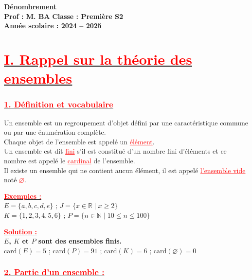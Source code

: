 \documentclass[a4paper,12pt]{article}
\begin{document}
\small

\begin{center}
    \Large\textbf{\underline{Dénombrement}}\\[-0.1cm]
    \normalsize\textbf{Prof : M. BA} \hfill \textbf{Classe : Première S2}\\[-0.1cm]
    \textbf{Année scolaire : 2024 -- 2025}
\end{center}

\section*{\underline{\textcolor{red}{I. Rappel sur la théorie des ensembles}}}

\subsubsection*{\underline{\textcolor{red}{1. Définition et vocabulaire}}}

Un ensemble est un regroupement d’objet défini par une caractéristique commune ou par une énumération complète.\\
Chaque objet de l’ensemble est appelé un \textcolor{red}{\underline{élément}}.\\
Un ensemble est dit \textcolor{red}{\underline{fini}} s’il est constitué d’un nombre fini d’éléments et ce nombre est appelé le \textcolor{red}{\underline{cardinal}} de l’ensemble.\\
Il existe un ensemble qui ne contient aucun élément, il est appelé \textcolor{red}{\underline{l’ensemble vide}} noté \textcolor{red}{\( \varnothing \)}.

\textbf{\underline{\textcolor{red}{Exemples :}}}\\
$E = \{ a, b, c, d, e \}$ \quad ; \quad $J = \{ x \in \mathbb{R} \mid x \geq 2 \}$\\
$K = \{ 1, 2, 3, 4, 5, 6 \}$ \quad ; \quad $P = \{ n \in \mathbb{N} \mid 10 \leq n \leq 100 \}$

\textbf{\underline{\textcolor{red}{Solution :}}}\\
\textbf{$E$, $K$ et $P$ sont des ensembles finis.}\\
$\text{card}(E) = 5$ \quad ; \quad $\text{card}(P) = 91$ \quad ; \quad $\text{card}(K) = 6$ \quad ; \quad $\text{card}(\varnothing) = 0$

\subsubsection*{\underline{\textcolor{red}{2. Partie d’un ensemble :}}}
\end{document}
